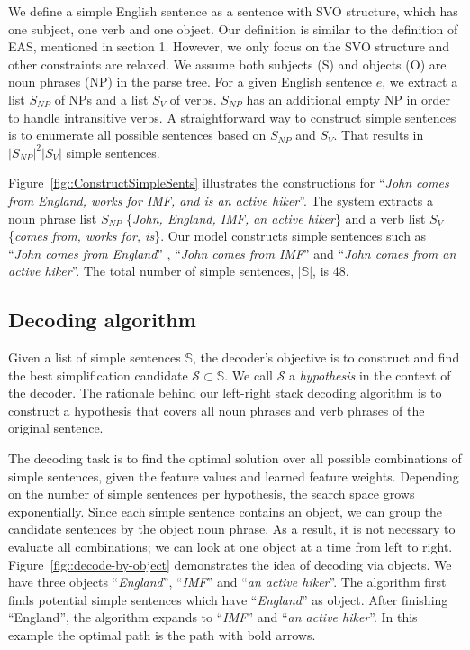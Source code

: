 \documentclass[10pt]{article}
\begin{document}
We define a simple English sentence as a sentence with SVO structure, which has one subject, one verb and one object.
Our definition is similar to the definition of EAS, mentioned in section 1. 
However, we only focus on the SVO structure and other constraints are relaxed.
We assume both subjects (S) and objects (O) are noun phrases (NP) in the parse tree.
For a given English sentence $e$, we extract a list $S_{NP}$ of NPs and a list $S_V$ of verbs.
$S_{NP}$ has an additional empty NP in order to handle intransitive verbs.
A straightforward way to construct simple sentences is to enumerate all possible sentences based on $S_{NP}$ and $S_V$.
That results in $|S_{NP}|^2|S_V|$ simple sentences.

Figure~\ref{fig::ConstructSimpleSents} illustrates the constructions for ``\textit{John comes from England, works for IMF, and is an active hiker}''. 
The system extracts a noun phrase list $S_{NP}$ \{\textit{John, England, IMF, an active hiker}\} and a verb list $S_V$ \{\textit{comes from, works for, is}\}.
Our model constructs simple sentences such as ``\textit{John comes from England}'' , ``\textit{John comes from IMF}'' and ``\textit{John comes from an active hiker}''.
The total number of simple sentences, $|\mathbb{S}|$, is 48.

\subsection{Decoding algorithm} 

Given a list of simple sentences $\mathbb{S}$, the decoder's objective is to construct and find the best simplification candidate $\mathcal{S} \subset \mathbb{S}$.
We call $\mathcal{S}$ a \textit{hypothesis} in the context of the decoder.
The rationale behind our left-right stack decoding algorithm is to construct a hypothesis that covers all noun phrases and verb phrases of the original sentence.

The decoding task is to find the optimal solution over all possible combinations of simple sentences, given the feature values and learned feature weights.
Depending on the number of simple sentences per hypothesis, the search space grows exponentially.
Since each simple sentence contains an object, we can group the candidate sentences by the object noun phrase.
As a result, it is not necessary to evaluate all combinations; we can look at one object at a time from left to right.
Figure~\ref{fig::decode-by-object} demonstrates the idea of decoding via objects.
We have three objects ``\textit{England}'', ``\textit{IMF}'' and ``\textit{an active hiker}''.
The algorithm first finds potential simple sentences which have ``\textit{England}'' as object.
After finishing ``England'', the algorithm expands to ``\textit{IMF}'' and ``\textit{an active hiker}''.
In this example the optimal path is the path with bold arrows.
\end{document}

